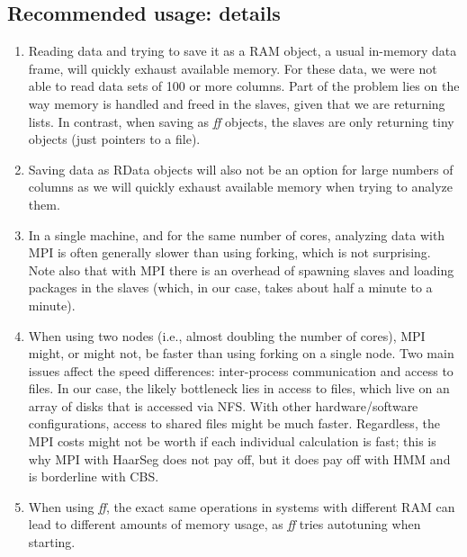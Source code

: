 \documentclass[a4paper,11pt]{article}
\begin{document}
\subsection{Recommended usage: details}\label{comments-detail}
\begin{enumerate}

\item Reading data and trying to save it as a RAM object, a usual
  in-memory data frame, will quickly exhaust available memory. For these
  data, we were not able to read data sets of 100 or more columns. Part of
  the problem lies on the way memory is handled and freed in the slaves,
  given that we are returning lists. In contrast, when saving as
  \textit{ff} objects, the slaves are only returning tiny objects (just
  pointers to a file).
  
\item Saving data as RData objects will also not be an option for large
  numbers of columns as we will quickly exhaust available memory when
  trying to analyze them. 
  
  
\item In a single machine, and for the same number of cores, analyzing
  data with MPI is often generally slower than using forking, which is not
  surprising. Note also that with MPI there is an overhead of spawning
  slaves and loading packages in the slaves (which, in our case, takes
  about half a minute to a minute). %
  
  
\item When using two nodes (i.e., almost doubling the number of cores),
  MPI might, or might not, be faster than using forking on a single
  node. Two main issues affect the speed differences: inter-process
  communication and access to files. In our case, the likely bottleneck
  lies in access to files, which live on an array of disks that is
  accessed via NFS. With other hardware/software configurations, access to
  shared files might be much faster. Regardless, the MPI costs might not
  be worth if each individual calculation is fast; this is why MPI with
  HaarSeg does not pay off, but it does pay off with HMM and is borderline
  with CBS.
  
  
\item When using \textit{ff}, the exact same operations in systems with
  different RAM can lead to different amounts of memory usage, as
  \textit{ff} tries autotuning when starting. 


\end{enumerate}
\end{document}
